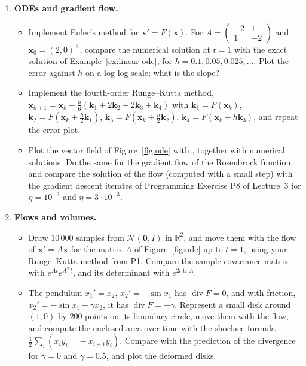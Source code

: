 \documentclass[11pt]{article}
\newcommand{\py}[1]{\texttt{\detokenize{#1}}}
\theoremstyle{definition}
\theoremstyle{plain}
\theoremstyle{remark}
\DeclareMathOperator{\tr}{tr}
\DeclareMathOperator{\Div}{div}
\begin{document}
\begin{enumerate}[label=\textbf{P\arabic*.}, leftmargin=*]
    \item \textbf{ODEs and gradient flow.}
    \begin{itemize}
        \item Implement Euler's method for $\mathbf{x}' = F(\mathbf{x})$. For $A = \begin{pmatrix} -2 & 1 \\ 1 & -2 \end{pmatrix}$ and $\mathbf{x}_0 = (2, 0)^\top$, compare the numerical solution at $t = 1$ with the exact solution of Example~\ref{ex:linear-ode}, for $h = 0.1, 0.05, 0.025, \ldots$. Plot the error against $h$ on a log-log scale; what is the slope?
        \item Implement the fourth-order Runge--Kutta method, $\mathbf{x}_{k+1} = \mathbf{x}_k + \frac{h}{6}(\mathbf{k}_1 + 2\mathbf{k}_2 + 2\mathbf{k}_3 + \mathbf{k}_4)$ with $\mathbf{k}_1 = F(\mathbf{x}_k)$, $\mathbf{k}_2 = F(\mathbf{x}_k + \frac{h}{2}\mathbf{k}_1)$, $\mathbf{k}_3 = F(\mathbf{x}_k + \frac{h}{2}\mathbf{k}_2)$, $\mathbf{k}_4 = F(\mathbf{x}_k + h\mathbf{k}_3)$, and repeat the error plot.
        \item Plot the vector field of Figure~\ref{fig:ode} with \py{plt.quiver}, together with numerical solutions. Do the same for the gradient flow of the Rosenbrock function, and compare the solution of the flow (computed with a small step) with the gradient descent iterates of Programming Exercise P8 of Lecture~3 for $\eta = 10^{-3}$ and $\eta = 3 \cdot 10^{-3}$.
    \end{itemize}

    \item \textbf{Flows and volumes.}
    \begin{itemize}
        \item Draw $10\,000$ samples from $\mathcal{N}(\mathbf{0}, I)$ in $\mathbb{R}^2$, and move them with the flow of $\mathbf{x}' = A\mathbf{x}$ for the matrix $A$ of Figure~\ref{fig:ode} up to $t = 1$, using your Runge--Kutta method from P1. Compare the sample covariance matrix with $e^{At}e^{A^\top t}$, and its determinant with $e^{2t\tr A}$.
        \item The pendulum $x_1' = x_2$, $x_2' = -\sin x_1$ has $\Div F = 0$, and with friction, $x_2' = -\sin x_1 - \gamma x_2$, it has $\Div F = -\gamma$. Represent a small disk around $(1, 0)$ by $200$ points on its boundary circle, move them with the flow, and compute the enclosed area over time with the shoelace formula $\frac{1}{2}\sum_i (x_iy_{i+1} - x_{i+1}y_i)$. Compare with the prediction of the divergence for $\gamma = 0$ and $\gamma = 0.5$, and plot the deformed disks.
    \end{itemize}


\end{enumerate}
\end{document}
